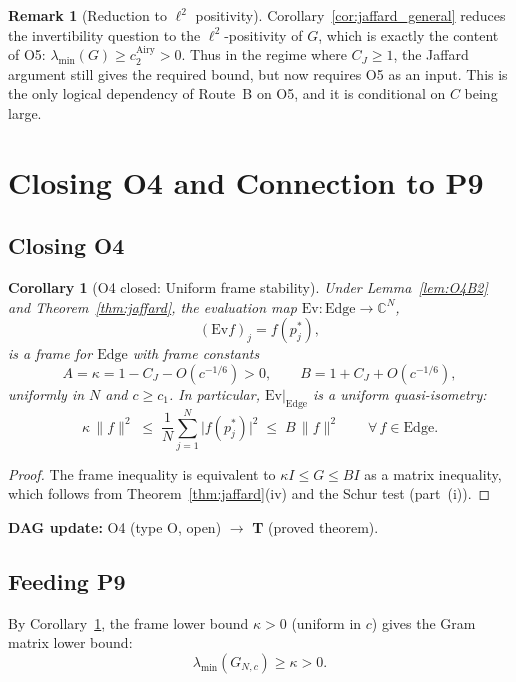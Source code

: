 \documentclass[12pt,a4paper]{amsart}
\newtheorem{corollary}[theorem]{Corollary}
\theoremstyle{definition}
\newtheorem{remark}[theorem]{Remark}
\newcommand{\Ev}{\mathrm{Ev}}
\newcommand{\Edge}{\mathrm{Edge}}
\newcommand{\lmin}{\lambda_{\min}}
\newcommand{\CJ}{C_J}
\newcommand{\abs}[1]{\lvert #1 \rvert}
\begin{document}
\begin{remark}[Reduction to $\ell^2$ positivity]
Corollary~\ref{cor:jaffard_general} reduces the invertibility question
to the $\ell^2$-positivity of $G$, which is exactly the content of O5:
$\lmin(G) \ge c_2^{\mathrm{Airy}} > 0$. Thus in the regime where
$\CJ \ge 1$, the Jaffard argument still gives the required bound,
but now requires O5 as an input. This is the only logical dependency
of Route~B on O5, and it is conditional on $C$ being large.
\end{remark}

\section{Closing O4 and Connection to P9}
\label{sec:closing}

\subsection{Closing O4}

\begin{corollary}[O4 closed: Uniform frame stability]
\label{cor:O4_closed}
Under Lemma~\ref{lem:O4B2} and Theorem~\ref{thm:jaffard}, the evaluation
map $\Ev\colon \Edge \to \mathbb{C}^N$,
\[
  (\Ev f)_j = f(p_j^*),
\]
is a \emph{frame} for $\Edge$ with frame constants
\[
  A = \kappa = 1 - \CJ - O(c^{-1/6}) > 0,
  \qquad
  B = 1 + \CJ + O(c^{-1/6}),
\]
uniformly in $N$ and $c \ge c_1$.
In particular, $\Ev|_{\Edge}$ is a \emph{uniform quasi-isometry}:
\[
  \kappa\,\|f\|^2 \;\le\; \frac{1}{N}\sum_{j=1}^N \abs{f(p_j^*)}^2 \;\le\; B\,\|f\|^2
  \qquad \forall\, f \in \Edge.
\]
\end{corollary}

\begin{proof}
The frame inequality is equivalent to
$\kappa I \le G \le B I$ as a matrix inequality, which follows from
Theorem~\ref{thm:jaffard}(iv) and the Schur test (part~(i)).
\end{proof}

\textbf{DAG update:} O4 (type O, open) $\to$ \textbf{T} (proved theorem).
\medskip

\subsection{Feeding P9}

By Corollary~\ref{cor:O4_closed}, the frame lower bound
$\kappa > 0$ (uniform in $c$) gives the Gram matrix lower bound:
\[
  \lmin(G_{N,c}) \ge \kappa > 0.
\]
\end{document}

